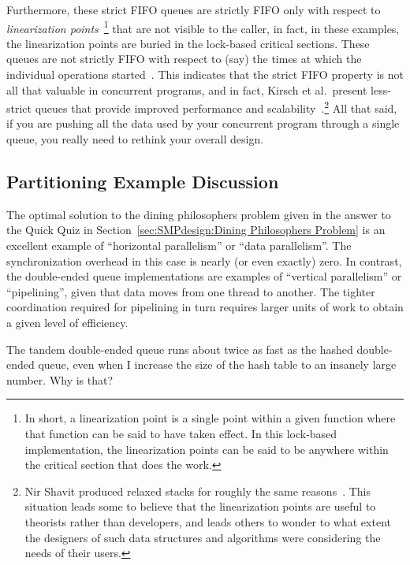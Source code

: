 Furthermore, these strict FIFO queues are strictly FIFO only with
respect to
\emph{linearization points}~\cite{Herlihy:1990:LCC:78969.78972}\footnote{
	In short, a linearization point is a single point within a given
	function where that function can be said to have taken effect.
	In this lock-based implementation, the linearization points
	can be said to be anywhere within the critical section that
	does the work.}
that are not visible to the caller, in fact, in these examples,
the linearization points are buried in the lock-based critical
sections.
These queues are not strictly FIFO with respect to (say) the times at which
the individual operations started~\cite{AndreasHaas2012FIFOisnt}.
This indicates that the strict FIFO property is not all that valuable
in concurrent programs, and in fact, Kirsch et al.~present less-strict
queues that provide improved performance and
scalability~\cite{ChristophMKirsch2012FIFOisntTR}.\footnote{
	Nir Shavit produced relaxed stacks for roughly the same
	reasons~\cite{Shavit:2011:DSM:1897852.1897873}.
	This situation leads some to believe that the linearization
	points are useful to theorists rather than developers, and
	leads others to wonder to what extent the designers of such
	data structures and algorithms were considering the needs
	of their users.}
All that said, if you are pushing all the data used by your concurrent
program through a single queue, you really need to rethink your
overall design.

\subsection{Partitioning Example Discussion}
\label{sec:SMPdesign:Partitioning Example Discussion}

The optimal solution to the dining philosophers problem given in
the answer to the Quick Quiz in
Section~\ref{sec:SMPdesign:Dining Philosophers Problem}
is an excellent example of ``horizontal parallelism'' or
``data parallelism''.
The synchronization overhead in this case is nearly (or even exactly)
zero.
In contrast, the double-ended
queue implementations are examples of ``vertical parallelism'' or
``pipelining'', given that data moves from one thread to another.
The tighter coordination required for pipelining in turn requires
larger units of work to obtain a given level of efficiency.

\QuickQuiz{}
	The tandem double-ended queue runs about twice as fast as
	the hashed double-ended queue, even when I increase the
	size of the hash table to an insanely large number.
	Why is that?
 \QuickQuizEnd

